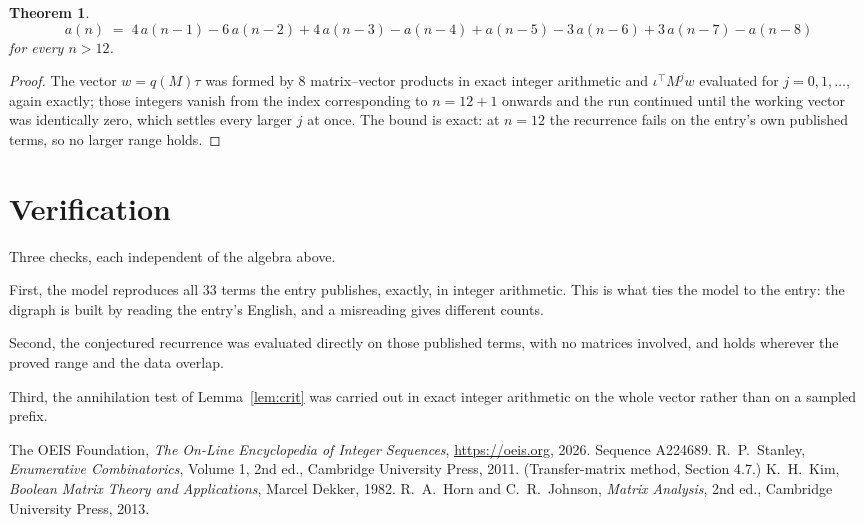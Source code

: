 \documentclass[11pt,a4paper]{article}
\theoremstyle{plain}
\newtheorem{theorem}{Theorem}
\theoremstyle{definition}
\begin{document}
\begin{theorem}
\[
a(n)\;=\;4\,a(n-1) - 6\,a(n-2) + 4\,a(n-3) - a(n-4) + a(n-5) - 3\,a(n-6) + 3\,a(n-7) - a(n-8)
\]
for every $n>12$.
\end{theorem}

\begin{proof}
The vector $w=q(M)\tau$ was formed by $8$ matrix--vector products in exact integer
arithmetic and $\iota^{\!\top}M^{j}w$ evaluated for $j=0,1,\dots$, again exactly; those
integers vanish from the index corresponding to $n=12+1$ onwards and the run continued
until the working vector was identically zero, which settles every larger $j$ at once. The bound is exact: at $n=12$ the recurrence fails on the entry's own published terms, so no larger range holds.
\end{proof}

\section{Verification}

Three checks, each independent of the algebra above.

First, the model reproduces all $33$ terms the entry publishes, exactly, in integer
arithmetic. This is what ties the model to the entry: the digraph is built by reading the
entry's English, and a misreading gives different counts.

Second, the conjectured recurrence was evaluated directly on those published terms, with no
matrices involved, and holds wherever the proved range and the data overlap.

Third, the annihilation test of Lemma~\ref{lem:crit} was carried out in exact integer
arithmetic on the whole vector rather than on a sampled prefix.

\begin{thebibliography}{9}
 The OEIS Foundation, \emph{The On-Line Encyclopedia of Integer
Sequences}, \url{https://oeis.org}, 2026. Sequence A224689.
 R.~P.~Stanley, \emph{Enumerative Combinatorics}, Volume 1, 2nd ed.,
Cambridge University Press, 2011. (Transfer-matrix method, Section 4.7.)
 K.~H.~Kim, \emph{Boolean Matrix Theory and Applications}, Marcel Dekker,
1982.
 R.~A.~Horn and C.~R.~Johnson, \emph{Matrix Analysis}, 2nd ed., Cambridge
University Press, 2013.
\end{thebibliography}
\end{document}
